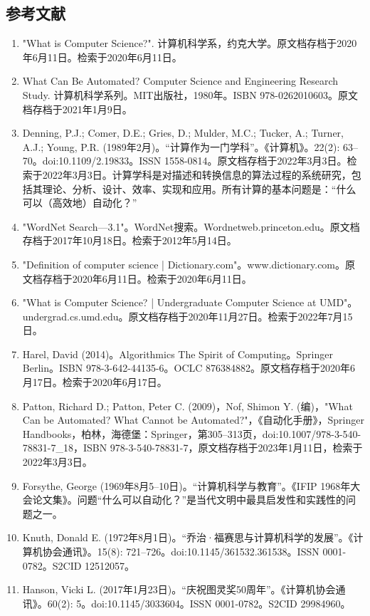 \subsection{参考文献 } 
\begin{enumerate}
\item "What is Computer Science?". 计算机科学系，约克大学。原文档存档于2020年6月11日。检索于2020年6月11日。  
\item What Can Be Automated? Computer Science and Engineering Research Study. 计算机科学系列。MIT出版社，1980年。ISBN 978-0262010603。原文档存档于2021年1月9日。  
\item Denning, P.J.; Comer, D.E.; Gries, D.; Mulder, M.C.; Tucker, A.; Turner, A.J.; Young, P.R. (1989年2月)。“计算作为一门学科”。《计算机》。22(2): 63–70。doi:10.1109/2.19833。ISSN 1558-0814。原文档存档于2022年3月3日。检索于2022年3月3日。计算学科是对描述和转换信息的算法过程的系统研究，包括其理论、分析、设计、效率、实现和应用。所有计算的基本问题是：“什么可以（高效地）自动化？”  
\item "WordNet Search—3.1"。WordNet搜索。Wordnetweb.princeton.edu。原文档存档于2017年10月18日。检索于2012年5月14日。  
\item "Definition of computer science | Dictionary.com"。www.dictionary.com。原文档存档于2020年6月11日。检索于2020年6月11日。  
\item "What is Computer Science? | Undergraduate Computer Science at UMD"。undergrad.cs.umd.edu。原文档存档于2020年11月27日。检索于2022年7月15日。  
\item Harel, David (2014)。Algorithmics The Spirit of Computing。Springer Berlin。ISBN 978-3-642-44135-6。OCLC 876384882。原文档存档于2020年6月17日。检索于2020年6月17日。  
\item Patton, Richard D.; Patton, Peter C. (2009)，Nof, Shimon Y. (编)，"What Can be Automated? What Cannot be Automated?"，《自动化手册》，Springer Handbooks，柏林，海德堡：Springer，第305–313页，doi:10.1007/978-3-540-78831-7_18，ISBN 978-3-540-78831-7，原文档存档于2023年1月11日，检索于2022年3月3日。  
\item Forsythe, George (1969年8月5–10日)。“计算机科学与教育”。《IFIP 1968年大会论文集》。问题“什么可以自动化？”是当代文明中最具启发性和实践性的问题之一。  
\item Knuth, Donald E. (1972年8月1日)。“乔治·福赛思与计算机科学的发展”。《计算机协会通讯》。15(8): 721–726。doi:10.1145/361532.361538。ISSN 0001-0782。S2CID 12512057。
\item Hanson, Vicki L. (2017年1月23日)。“庆祝图灵奖50周年”。《计算机协会通讯》。60(2): 5。doi:10.1145/3033604。ISSN 0001-0782。S2CID 29984960。  

\end{enumerate}
